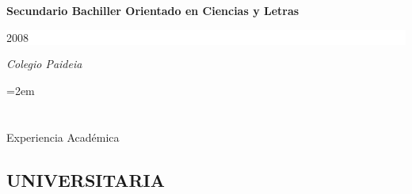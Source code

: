 \documentclass[paper=a4,fontsize=11pt]{scrartcl} %
\newcommand{\sepspace}{\vspace*{1em}}       %
\newcommand{\NewPart}[1]{\section*{\uppercase{#1}}}
\newcommand{\NewSubPart}[1]{\subsection*{\uppercase{#1}}}
\newcommand{\EducationEntry}[4]{
        \noindent \textbf{#1} \hfill      %
        \colorbox{White}{%
            \parbox{10em}{%
            \hfill\color{Black}#2}} \par  %
        \noindent \textit{#3} \par        %
        \noindent\hangindent=2em\hangafter=0 \small #4 %
        \normalsize \par}
\begin{document}
    \sepspace



  \EducationEntry{Secundario Bachiller Orientado en Ciencias y Letras}{2008}{Colegio Paideia}


\NewPart{Experiencia Académica}{}

\NewSubPart{Universitaria}{}


%


%
\end{document}
